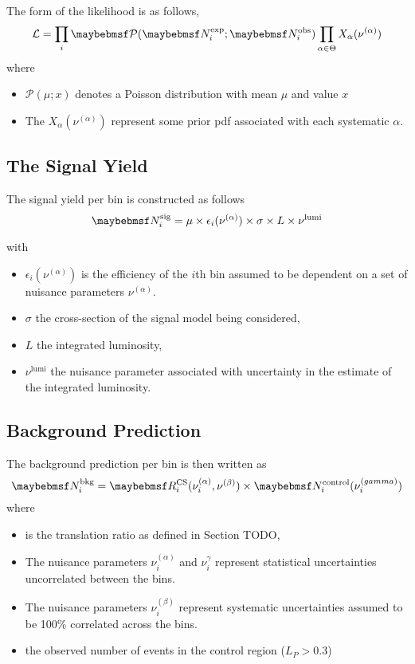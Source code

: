 The form of the likelihood is as follows,
\begin{equation}
\mathcal{L} = \prod_i \Poisson(\NExpi ; \NObsi)
\prod_{\alpha \in \Theta}  X_\alpha(\nu^{(\alpha)})
\end{equation}
where
\begin{itemize}
\item $\mathcal{P}(\mu;x)$ denotes a Poisson distribution with mean $\mu$ and value
$x$
\item The $X_\alpha(\nu^{(\alpha)})$ represent some prior pdf associated with
  each systematic $\alpha$.
\end{itemize}

\subsection{The Signal Yield}
The signal yield per bin is constructed as follows
\begin{equation}
\NSigi = \mu \times \epsilon_i(\nu^{(\alpha)}) \times \sigma \times L \times \nu^{\textrm{lumi}}
\end{equation}

with
\begin{itemize}
\item $\epsilon_i(\nu^{(\alpha)})$ is the efficiency of the $i$th bin assumed to be
  dependent on a set of nuisance parameters $\nu^{(\alpha)}$.
\item $\sigma$ the cross-section of the signal model being considered,
\item $L$ the integrated luminosity,
\item $\nu^{\textrm{lumi}}$ the nuisance parameter associated with uncertainty in the
estimate of the integrated luminosity.
\end{itemize}

\subsection{Background Prediction}
The background prediction per bin is then written as
\begin{equation}
\NBkgi = \RCSi(\nu_i^{(\alpha)}, \nu^{(\beta)}) \times \NControli(\nu_i^{(\gamma)})
\end{equation}
where
\begin{itemize}
\item \RCSi is the translation ratio as defined in Section TODO,
\item The nuisance parameters $\nu_i^{(\alpha)}$ and $\nu_i^{\gamma}$ represent
  statistical uncertainties uncorrelated between the bins.
\item The nuisance parameters $\nu_i^{(\beta)}$ represent systematic
  uncertainties assumed to be 100\% correlated across the bins.
\item \NControli the observed number of events in the control region
($L_P > 0.3$)
\end{itemize}

